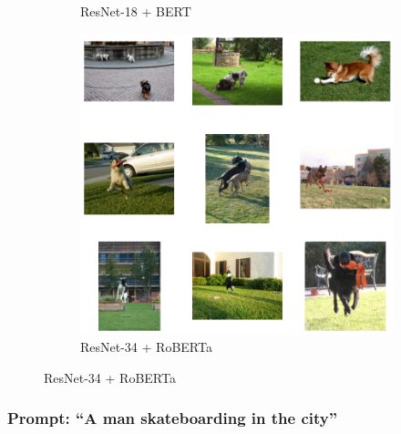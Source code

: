 \documentclass[11pt]{article}
\begin{document}
\begin{figure}[H]
\begin{subfigure}[b]{0.3\textwidth}
        \caption{\tiny ResNet-18 + BERT}
    \end{subfigure}
    \hfill
    \begin{subfigure}[b]{0.3\textwidth}
        \includegraphics[width=\linewidth]{Q2/A dog sitting alone in a park/3.png}
        \caption{\tiny ResNet-34 + RoBERTa}
    \end{subfigure}
    
\end{figure}

\subsubsection{Prompt: ``A man skateboarding in the city''}
\vspace{0.5em}
\end{document}
